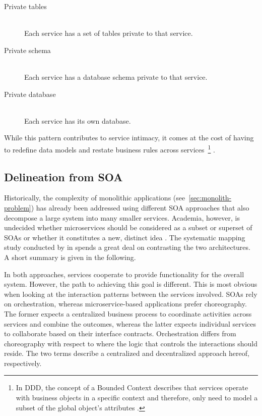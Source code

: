 \begin{description}
  \item[Private tables]
  \hfill \\
  Each service has a set of tables private to that service.

  \item[Private schema]
  \hfill \\
  Each service has a database schema private to that service.

  \item[Private database]
  \hfill \\
  Each service has its own database.
\end{description}

While this pattern contributes to service intimacy, it comes at the cost of having to redefine data models and restate business rules across services~\footnote{In \acl{DDD}, the concept of a Bounded Context describes that services operate with business objects in a specific context and therefore, only need to model a subset of the global object's attributes \cite[p.~30]{cerny2018contextual}.} \cite[p.~30]{cerny2018contextual}.


\subsection{Delineation from \acl{SOA}}
\label{sec:soa-microservice-comparison}

Historically, the complexity of monolithic applications (see~\autoref{sec:monolith-problem}) has already been addressed using different \acf{SOA} approaches that also decompose a large system into many smaller services. Academia, however, is undecided whether microservices should be considered as a subset or superset of \acp{SOA} or whether it constitutes a new, distinct idea \cite[pp.~584--585]{villamizar2015evaluating} \cite[p.~30]{cerny2018contextual}. The systematic mapping study conducted by \citeauthor{cerny2018contextual} in \cite{cerny2018contextual} spends a great deal on contrasting the two architectures. A short summary is given in the following.

In both approaches, services cooperate to provide functionality for the overall system. However, the path to achieving this goal is different. This is most obvious when looking at the interaction patterns between the services involved. \acp{SOA} rely on orchestration, whereas microservice-based applications prefer choreography. The former expects a centralized business process to coordinate activities across services and combine the outcomes, whereas the latter expects individual services to collaborate based on their interface contracts. Orchestration differs from choreography with respect to where the logic that controls the interactions should reside. The two terms describe a centralized and decentralized approach hereof, respectively.

